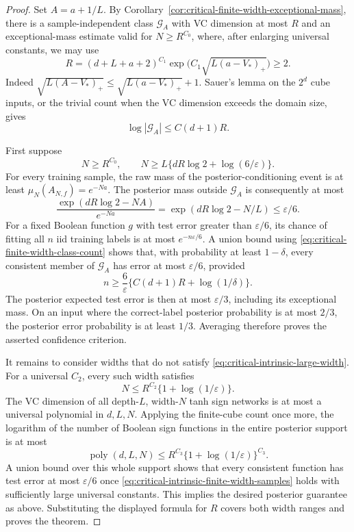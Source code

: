 \begin{proof}
Set $A=a+1/L$. By
Corollary~\ref{cor:critical-finite-width-exceptional-mass}, there is a
sample-independent class $\mathcal G_A$ with VC dimension at most $R$
and an exceptional-mass estimate valid for $N\ge R^{C_0}$, where, after
enlarging universal constants, we may use
\[
 R=(d+L+a+2)^{C_1}
            \exp\!\big(C_1\sqrt{L(a-V_*)_+}\big)\ge2.
\]
Indeed
$\sqrt{L(A-V_*)_+}\le\sqrt{L(a-V_*)_+}+1$.
Sauer's lemma on the $2^d$ cube inputs, or the trivial count when the
VC dimension exceeds the domain size, gives
\begin{equation}\label{eq:critical-finite-width-class-count}
 \log|\mathcal G_A|\le C(d+1)R.
\end{equation}

First suppose
\begin{equation}\label{eq:critical-intrinsic-large-width}
 N\ge R^{C_0},\qquad
 N\ge L\{dR\log2+\log(6/\varepsilon)\}.
\end{equation}
For every training sample, the raw mass of the posterior-conditioning
event is at least $\mu_N(A_{N,f})=e^{-Na}$.
The posterior mass outside $\mathcal G_A$ is consequently at most
\[
 \frac{\exp(dR\log2-NA)}{e^{-Na}}
   =\exp(dR\log2-N/L)\le\varepsilon/6.
\]
For a fixed Boolean function $g$ with test error greater than
$\varepsilon/6$, its chance of fitting all $n$ iid training labels is
at most $e^{-n\varepsilon/6}$. A union bound using
\eqref{eq:critical-finite-width-class-count} shows that, with probability
at least $1-\delta$, every consistent member of $\mathcal G_A$ has
error at most $\varepsilon/6$, provided
\[
 n\ge\frac6\varepsilon
       \{C(d+1)R+\log(1/\delta)\}.
\]
The posterior expected test error is then at most $\varepsilon/3$,
including its exceptional mass. On an input where the correct-label
posterior probability is at most $2/3$, the posterior error probability
is at least $1/3$. Averaging therefore proves the asserted confidence
criterion.

It remains to consider widths that do not satisfy
\eqref{eq:critical-intrinsic-large-width}. For a universal $C_2$,
every such width satisfies
\[
 N\le R^{C_2}\{1+\log(1/\varepsilon)\}.
\]
The VC dimension of all depth-$L$, width-$N$ tanh sign networks is at
most a universal polynomial in $d,L,N$. Applying the finite-cube count
once more, the logarithm of the number of Boolean sign functions in
the entire posterior support is at most
\[
 \operatorname{poly}(d,L,N)
 \le R^{C_3}\{1+\log(1/\varepsilon)\}^{C_3}.
\]
A union bound over this whole support shows that every consistent
function has test error at most $\varepsilon/6$ once
\eqref{eq:critical-intrinsic-finite-width-samples} holds with sufficiently
large universal constants. This implies the desired posterior guarantee
as above. Substituting the displayed formula for $R$ covers both width
ranges and proves the theorem.
\end{proof}

